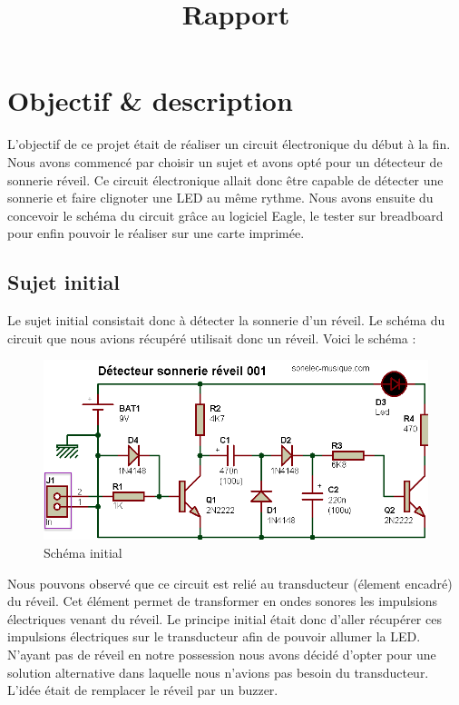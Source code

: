 


\title{Rapport }



\chapter{Objectif \& description} 

L'objectif de ce projet était de réaliser un circuit électronique du début à la fin. Nous avons commencé par choisir un sujet et avons opté pour un détecteur de sonnerie réveil. Ce circuit électronique allait donc être capable de détecter une sonnerie et faire clignoter une LED au même rythme. Nous avons ensuite du concevoir le schéma du circuit grâce au logiciel Eagle, le tester sur breadboard pour enfin pouvoir le réaliser sur une carte imprimée.

\section{Sujet initial}

Le sujet initial consistait donc à détecter la sonnerie d'un réveil. Le schéma du circuit que nous avions récupéré utilisait donc un réveil. Voici le schéma : 

\begin{figure}[H]
\centering
\includegraphics[width=1\textwidth]{ressources/schema_initTransdu}
\caption{Schéma initial}
\label{schemaInit}
\end{figure}

Nous pouvons observé que ce circuit est relié au transducteur (élement encadré) du réveil. Cet élément permet de transformer en ondes sonores les impulsions électriques venant du réveil. Le principe initial était donc d'aller récupérer ces impulsions électriques sur le transducteur afin de pouvoir allumer la LED. 
N'ayant pas de réveil en notre possession nous avons décidé d'opter pour une solution alternative dans laquelle nous n'avions pas besoin du transducteur. L'idée était de remplacer le réveil par un buzzer.

